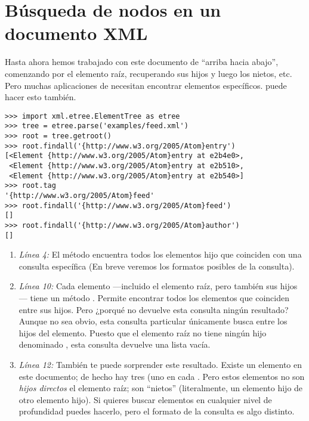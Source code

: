 \section{Búsqueda de nodos en un documento XML}

Hasta ahora hemos trabajado con este documento  de ``arriba hacia abajo'', comenzando por el elemento raíz, recuperando sus hijos y luego los nietos, etc. Pero muchas aplicaciones de  necesitan encontrar elementos específicos.  puede hacer esto también.

\noindent\begin{minipage}{\textwidth}
\begin{lstlisting}[mathescape=True]
>>> import xml.etree.ElementTree as etree
>>> tree = etree.parse('examples/feed.xml')
>>> root = tree.getroot()
>>> root.findall('{http://www.w3.org/2005/Atom}entry')
[<Element {http://www.w3.org/2005/Atom}entry at e2b4e0>,
 <Element {http://www.w3.org/2005/Atom}entry at e2b510>,
 <Element {http://www.w3.org/2005/Atom}entry at e2b540>]
>>> root.tag
'{http://www.w3.org/2005/Atom}feed'
>>> root.findall('{http://www.w3.org/2005/Atom}feed')
[]
>>> root.findall('{http://www.w3.org/2005/Atom}author')
[]
\end{lstlisting}
\end{minipage}

\begin{enumerate}

\item \emph{Línea 4:} El método  encuentra todos los elementos hijo que coinciden con una consulta específica (En breve veremos los formatos posibles de la consulta).

\item \emph{Línea 10:} Cada elemento ---incluido el elemento raíz, pero también sus hijos--- tiene un método . Permite encontrar todos los elementos que coinciden entre sus hijos. Pero ¿porqué no devuelve esta consulta ningún resultado? Aunque no sea obvio, esta consulta particular únicamente busca entre los hijos del elemento. Puesto que el elemento raíz  no tiene ningún hijo denominado , esta consulta devuelve una lista vacía.

\item \emph{Línea 12:} También te puede sorprender este resultado. Existe un elemento  en este documento; de hecho hay tres (uno en cada . Pero estos elementos  no son \emph{hijos directos} el elemento raíz; son ``nietos'' (literalmente, un elemento hijo de otro elemento hijo). Si quieres buscar elementos  en cualquier nivel de profundidad puedes hacerlo, pero el formato de la consulta es algo distinto.

\end{enumerate}

